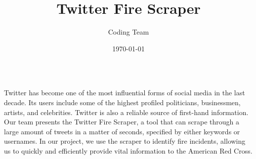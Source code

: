 \documentclass{tikzposter}
\title{Twitter Fire Scraper}
\author{Coding Team}
\date{\today}
\institute{Illinois Institute of Technology}
\begin{document}
\maketitle

\begin{columns}

{
    {
    \fontsize{36pt}{14pt}\selectfont
    Twitter has become one of the most influential forms of social media in the last decade. Its users include some of the highest profiled politicians, businessmen, artists, and celebrities. Twitter is also a reliable source of first-hand information. Our team presents the Twitter Fire Scraper, a tool that can scrape through a large amount of tweets in a matter of seconds, specified by either keywords or usernames. In our project, we use the scraper to identify fire incidents, allowing us to quickly and efficiently provide vital information to the American Red Cross.     
    }
}


\end{columns}
\end{document}
